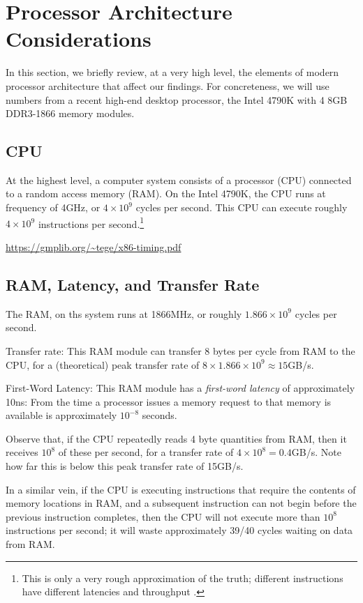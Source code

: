\documentclass{patmorin}
\begin{document}
\section{Processor Architecture Considerations}

In this section, we briefly review, at a very high level, the elements of
modern processor architecture that affect our findings.  For concreteness,
we will use numbers from a recent high-end desktop processor, the Intel
4790K \cite{S} with 4 8GB DDR3-1866 memory modules.

\subsection{CPU}

At the highest level, a computer system consists of a processor (CPU)
connected to a random access memory (RAM). On the Intel 4790K, the
CPU runs at frequency of 4GHz, or $4\times10^9$ cycles per second.
This CPU can execute roughly $4\times 10^{9}$ instructions per
second.\footnote{This is only a very rough approximation of the
truth; different instructions have different latencies and throughput
\cite{granlund.instruction}.}

\url{https://gmplib.org/~tege/x86-timing.pdf}


\subsection{RAM, Latency, and Transfer Rate}

The RAM, on ths system runs at 1866MHz, or roughly $1.866\times10^9$
cycles per second.

Transfer rate: This RAM module can transfer 8 bytes per cycle from RAM
to the CPU, for a (theoretical) peak transfer rate of 
$8\times 1.866\times10^9\approx 15$GB/s.

First-Word Latency: This RAM module has a \emph{first-word latency} of
approximately 10ns: From the time a processor issues a memory request
to that memory is available is approximately $10^{-8}$ seconds.

Observe that, if the CPU repeatedly reads 4 byte quantities from RAM,
then it receives $10^8$ of these per second, for a transfer rate of
$4\times 10^8=0.4$GB/s.  Note how far this is below this peak transfer
rate of 15GB/s.

In a similar vein, if the CPU is executing instructions that require
the contents of memory locations in RAM, and a subsequent instruction
can not begin before the previous instruction completes, then the CPU
will not execute more than $10^8$ instructions per second; it will waste
approximately 39/40 cycles waiting on data from RAM.
\end{document}
